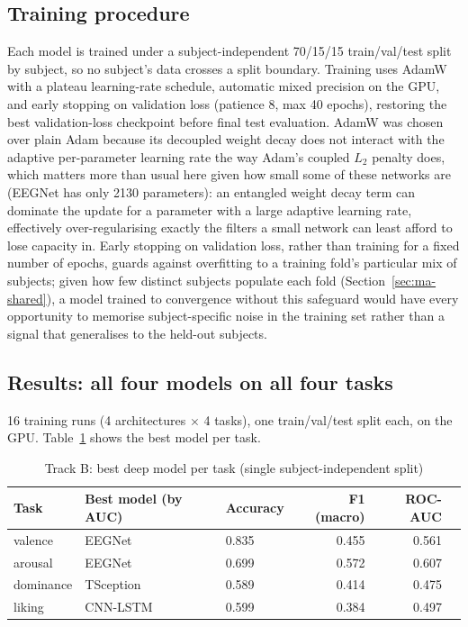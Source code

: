 \documentclass[11pt]{report}
\begin{document}
\subsection{Training procedure}
Each model is trained under a subject-independent 70/15/15 train/val/test
split by subject, so no subject's data crosses a split boundary. Training
uses AdamW \citep{loshchilov2019adamw} with a plateau learning-rate
schedule, automatic mixed precision on the GPU, and early stopping on
validation loss (patience 8, max 40 epochs), restoring the best
validation-loss checkpoint before final test evaluation. AdamW was chosen
over plain Adam because its decoupled weight decay does not interact with
the adaptive per-parameter learning rate the way Adam's coupled $L_2$
penalty does, which matters more than usual here given how small some of
these networks are (EEGNet has only 2130 parameters): an entangled weight
decay term can dominate the update for a parameter with a large adaptive
learning rate, effectively over-regularising exactly the filters a small
network can least afford to lose capacity in. Early stopping on validation
loss, rather than training for a fixed number of epochs, guards against
overfitting to a training fold's particular mix of subjects; given how few
distinct subjects populate each fold (Section~\ref{sec:ma-shared}), a model
trained to convergence without this safeguard would have every opportunity
to memorise subject-specific noise in the training set rather than a signal
that generalises to the held-out subjects.

\subsection{Results: all four models on all four tasks}
16 training runs (4 architectures $\times$ 4 tasks), one train/val/test
split each, on the GPU. Table~\ref{tab:track-b-best} shows the best model
per task.

\begin{table}[h]
\centering
\caption{Track B: best deep model per task (single subject-independent split)}
\label{tab:track-b-best}
\begin{tabular}{lllrrr}
\toprule
Task & Best model (by AUC) & Accuracy & F1 (macro) & ROC-AUC \\
\midrule
valence   & EEGNet     & 0.835 & 0.455 & 0.561 \\
arousal   & EEGNet     & 0.699 & 0.572 & 0.607 \\
dominance & TSception  & 0.589 & 0.414 & 0.475 \\
liking    & CNN-LSTM   & 0.599 & 0.384 & 0.497 \\
\bottomrule
\end{tabular}
\end{table}
\end{document}
